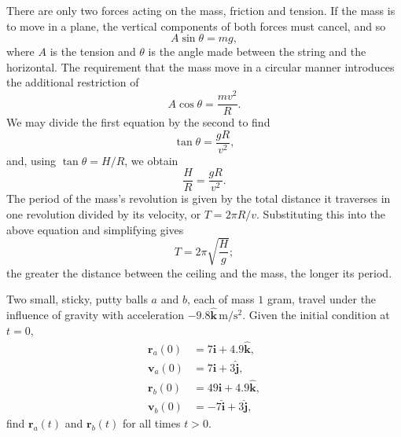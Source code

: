 \documentclass[../feynman-lectures-on-physics.tex]{subfiles}
\begin{document}
\begin{questions}
	\begin{solution}
		There are only two forces acting on the mass, friction and tension. If the
		mass is to move in a plane, the vertical components of both forces must
		cancel, and so
		\[
		A\sin\theta = mg,
		\]
		where $A$ is the tension and $\theta$
		is the angle made between the string and the horizontal. The requirement
		that the mass move in a circular manner introduces the additional
		restriction of
		\[
		A\cos\theta = \frac{mv^2}{R}.
		\]
		We may divide the first equation by the second to find
		\[
		\tan\theta = \frac{gR}{v^2},
		\]
		and, using $\tan\theta = H/R$, we obtain
		\[
		\frac{H}{R} = \frac{gR}{v^2}.
		\]
		The period of the mass's revolution is given by the total distance it
		traverses in one revolution divided by its velocity, or $T = 2\pi{R}/v$.
		Substituting this into the above equation and simplifying gives
		\[
		T = 2\pi\sqrt{\frac{H}{g}};
		\]
		the greater the distance between the ceiling and the mass, the longer its period.
	\end{solution}
	
	\question Two small, sticky, putty balls $a$ and $b$, each of mass $1$ gram,
	travel under the influence of gravity with acceleration
	$-9.8\hat{\mathbf{k}}\,\si{\meter\per\second\squared}$. Given the initial
	condition at $t=0$,
	\begin{align*}
		\mathbf{r}_a(0) &= 7\hat{\mathbf{i}} + 4.9\hat{\mathbf{k}}, \\
		\mathbf{v}_a(0) &= 7\hat{\mathbf{i}} + 3\hat{\mathbf{j}}, \\
		\mathbf{r}_b(0) &= 49\hat{\mathbf{i}} + 4.9\hat{\mathbf{k}}, \\
		\mathbf{v}_b(0) &= -7\hat{\mathbf{i}} + 3\hat{\mathbf{j}},
	\end{align*}
	find $\mathbf{r}_a(t)$ and $\mathbf{r}_b(t)$ for all times $t>0$.
	

\end{questions}
\end{document}

